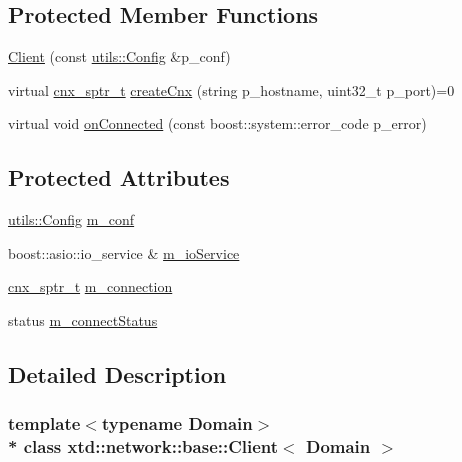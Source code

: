 \subsection*{Protected Member Functions}
\begin{DoxyCompactItemize}
\item 
\hyperlink{classxtd_1_1network_1_1base_1_1Client_a7afc6ed48caf877014df0a3128d6ed05}{Client} (const \hyperlink{classxtd_1_1network_1_1utils_1_1Config}{utils\+::\+Config} \&p\+\_\+conf)
\item 
virtual \hyperlink{classxtd_1_1network_1_1base_1_1Client_a3cef8310676dac754d630bcc1628ab56}{cnx\+\_\+sptr\+\_\+t} \hyperlink{classxtd_1_1network_1_1base_1_1Client_ad7964979939106d0c496c4f78a834b0d}{create\+Cnx} (string p\+\_\+hostname, uint32\+\_\+t p\+\_\+port)=0
\item 
virtual void \hyperlink{classxtd_1_1network_1_1base_1_1Client_a05ea029f4bfed5d9581ebc606e198336}{on\+Connected} (const boost\+::system\+::error\+\_\+code p\+\_\+error)
\end{DoxyCompactItemize}
\subsection*{Protected Attributes}
\begin{DoxyCompactItemize}
\item 
\hyperlink{classxtd_1_1network_1_1utils_1_1Config}{utils\+::\+Config} \hyperlink{classxtd_1_1network_1_1base_1_1Client_addb0f7fb40585d3db038b16f11e466cd}{m\+\_\+conf}
\item 
boost\+::asio\+::io\+\_\+service \& \hyperlink{classxtd_1_1network_1_1base_1_1Client_ae3945e4771a207872ab45b73de2e040f}{m\+\_\+io\+Service}
\item 
\hyperlink{classxtd_1_1network_1_1base_1_1Client_a3cef8310676dac754d630bcc1628ab56}{cnx\+\_\+sptr\+\_\+t} \hyperlink{classxtd_1_1network_1_1base_1_1Client_a9293a756af76e066790a1f389dbedb77}{m\+\_\+connection}
\item 
status \hyperlink{classxtd_1_1network_1_1base_1_1Client_a99e6d675c7617cd6d8e94793d8af4871}{m\+\_\+connect\+Status}
\end{DoxyCompactItemize}


\subsection{Detailed Description}
\subsubsection*{template$<$typename Domain$>$\\*
class xtd\+::network\+::base\+::\+Client$<$ Domain $>$}

